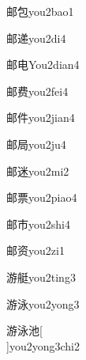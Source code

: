 \begin{verbete}[7;5]{邮包}{you2bao1}
\end{verbete}

\begin{verbete}[7;10]{邮递}{you2di4}
\end{verbete}

\begin{verbete}[7;5]{邮电}{You2dian4}
\end{verbete}

\begin{verbete}[7;9]{邮费}{you2fei4}
\end{verbete}

\begin{verbete}[7;6]{邮件}{you2jian4}
\end{verbete}

\begin{verbete}[7;7]{邮局}{you2ju4}
\end{verbete}

\begin{verbete}[7;9]{邮迷}{you2mi2}
\end{verbete}

\begin{verbete}[7;11]{邮票}{you2piao4}
\end{verbete}

\begin{verbete}[7;5]{邮市}{you2shi4}
\end{verbete}

\begin{verbete}[7;10]{邮资}{you2zi1}
\end{verbete}

\begin{verbete}[12;12]{游艇}{you2ting3}
\end{verbete}

\begin{verbete}[12;8]{游泳}{you2yong3}
\end{verbete}

\begin{verbete}[12;8;6]{游泳池}[\\]{you2yong3chi2}
\end{verbete}

